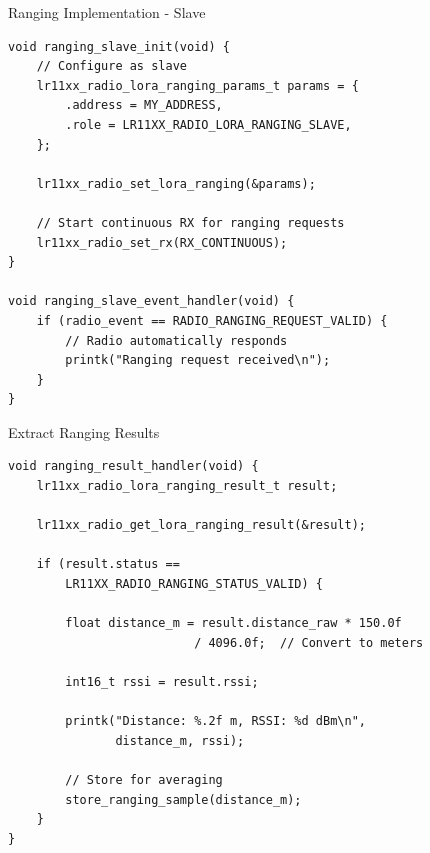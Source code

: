 \documentclass{beamer}
\begin{document}
\begin{frame}[fragile]{Ranging Implementation - Slave}
\begin{lstlisting}[caption={Respond to Ranging Request (Slave)}]
void ranging_slave_init(void) {
    // Configure as slave
    lr11xx_radio_lora_ranging_params_t params = {
        .address = MY_ADDRESS,
        .role = LR11XX_RADIO_LORA_RANGING_SLAVE,
    };

    lr11xx_radio_set_lora_ranging(&params);

    // Start continuous RX for ranging requests
    lr11xx_radio_set_rx(RX_CONTINUOUS);
}

void ranging_slave_event_handler(void) {
    if (radio_event == RADIO_RANGING_REQUEST_VALID) {
        // Radio automatically responds
        printk("Ranging request received\n");
    }
}
\end{lstlisting}
\end{frame}

\begin{frame}[fragile]{Extract Ranging Results}
\begin{lstlisting}[caption={Parse Ranging Results (Master)}]
void ranging_result_handler(void) {
    lr11xx_radio_lora_ranging_result_t result;

    lr11xx_radio_get_lora_ranging_result(&result);

    if (result.status ==
        LR11XX_RADIO_RANGING_STATUS_VALID) {

        float distance_m = result.distance_raw * 150.0f
                          / 4096.0f;  // Convert to meters

        int16_t rssi = result.rssi;

        printk("Distance: %.2f m, RSSI: %d dBm\n",
               distance_m, rssi);

        // Store for averaging
        store_ranging_sample(distance_m);
    }
}
\end{lstlisting}
\end{frame}
\end{document}
